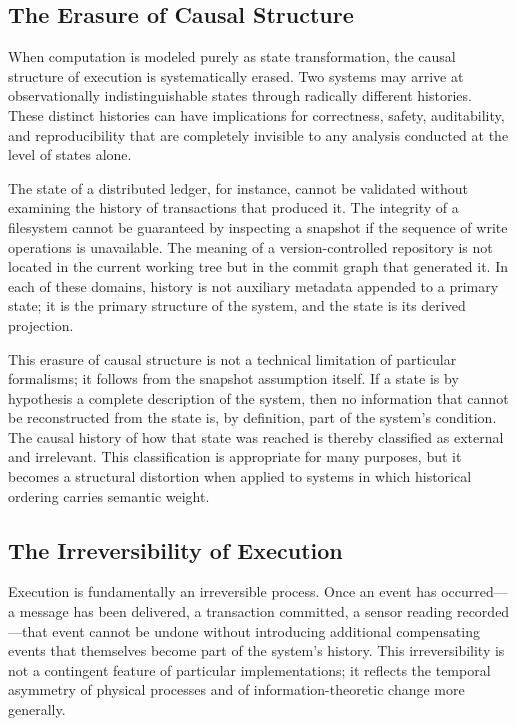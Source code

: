 \documentclass[12pt]{article}
\begin{document}
\subsection{The Erasure of Causal Structure}

When computation is modeled purely as state transformation, the causal structure of execution is systematically erased. Two systems may arrive at observationally indistinguishable states through radically different histories. These distinct histories can have implications for correctness, safety, auditability, and reproducibility that are completely invisible to any analysis conducted at the level of states alone.

The state of a distributed ledger, for instance, cannot be validated without examining the history of transactions that produced it. The integrity of a filesystem cannot be guaranteed by inspecting a snapshot if the sequence of write operations is unavailable. The meaning of a version-controlled repository is not located in the current working tree but in the commit graph that generated it. In each of these domains, history is not auxiliary metadata appended to a primary state; it is the primary structure of the system, and the state is its derived projection.

This erasure of causal structure is not a technical limitation of particular formalisms; it follows from the snapshot assumption itself. If a state is by hypothesis a complete description of the system, then no information that cannot be reconstructed from the state is, by definition, part of the system's condition. The causal history of how that state was reached is thereby classified as external and irrelevant. This classification is appropriate for many purposes, but it becomes a structural distortion when applied to systems in which historical ordering carries semantic weight.

\subsection{The Irreversibility of Execution}

Execution is fundamentally an irreversible process. Once an event has occurred---a message has been delivered, a transaction committed, a sensor reading recorded---that event cannot be undone without introducing additional compensating events that themselves become part of the system's history. This irreversibility is not a contingent feature of particular implementations; it reflects the temporal asymmetry of physical processes and of information-theoretic change more generally.
\end{document}
